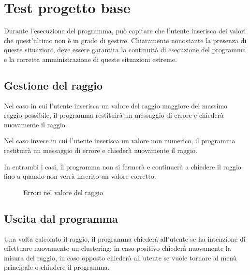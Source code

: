 \section{Test progetto base}

Durante l'esecuzione del programma, può capitare che l'utente inserisca dei valori che quest'ultimo non è in grado di gestire. Chiaramente nonostante la presenza di queste situazioni, deve essere garantita la continuità di esecuzione del programma e la corretta amministrazione di queste situazioni estreme.

\subsection{Gestione del raggio}

Nel caso in cui l'utente inserisca un valore del raggio maggiore del massimo raggio possibile, il programma restituirà un messaggio di errore e chiederà nuovamente il raggio.

Nel caso invece in cui l'utente inserisca un valore non numerico, il programma restituirà un messaggio di errore e chiederà nuovamente il raggio.

In entrambi i casi, il programma non si fermerà e continuerà a chiedere il raggio fino a quando non verrà inserito un valore corretto.

\begin{figure}[h!]
    \centering
    \hfill
    \caption{Errori nel valore del raggio}
\end{figure}

\subsection{Uscita dal programma}
Una volta calcolato il raggio, il programma chiederà all'utente se ha intenzione di effettuare nuovamente un clustering: in caso positivo chiederà nuovamente la misura del raggio, in caso opposto chiederà all'utente se vuole tornare al menù principale o chiudere il programma. 


